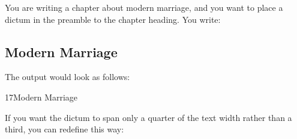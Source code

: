  \begin{Example}
   You are writing a chapter about modern marriage, and you want to place a
   dictum in the preamble to the chapter heading. You write:
\begin{lstcode}
  \chapter{Modern Marriage}
\end{lstcode}
  The output would look as follows:
  \begin{ShowOutput}
    {%
      17\enskip Modern Marriage\par} \vspace{\baselineskip}
  \end{ShowOutput}

  If you want the dictum to span only a quarter of the text width
  rather than a third, you can redefine  this way:
\begin{lstcode}
  \renewcommand*{\dictumwidth}{.25\textwidth}
\end{lstcode}
\end{Example}

%
\fi
%
\EndIndexGroup
%
\EndIndexGroup

